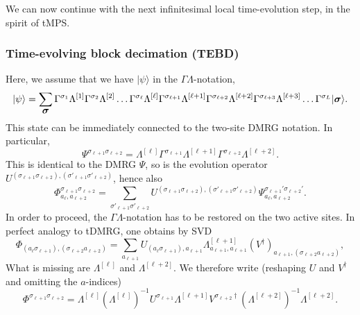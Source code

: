 \documentclass[a4paper,10pt,oneside,onecolumn,1p,times]{elsarticle}
\newcommand{\ket}[1]{\mbox{$| #1  \rangle$}}
\newcommand{\fat}[1]{\mbox{\boldmath$#1$\unboldmath}}	%
\begin{document}
We can now continue with the next infinitesimal local time-evolution step, in the spirit of tMPS.   
\subsubsection{Time-evolving block decimation (TEBD)}
Here, we assume that we have $\ket{\psi}$ in the $\Gamma\Lambda$-notation,
\begin{equation}
\ket{\psi} = \sum_{\fat{\sigma}} 
\Gamma^{\sigma_1} \Lambda^{[1]} \Gamma^{\sigma_2} \Lambda^{[2]} \ldots
\Gamma^{\sigma_{\ell}} \Lambda^{[\ell]}  \Gamma^{\sigma_{\ell+1}} \Lambda^{[\ell+1]}
\Gamma^{\sigma_{\ell+2}} \Lambda^{[\ell+2]}  \Gamma^{\sigma_{\ell+3}} \Lambda^{[\ell+3]} \ldots
\Gamma^{\sigma_L}   
\ket{\fat{\sigma}}.
\label{eq:TEBDstart}
\end{equation}
This state can be immediately connected to the two-site DMRG notation. In particular,
\begin{equation}
\Psi^{\sigma_{\ell+1} \sigma_{\ell+2}} = \Lambda^{[\ell]}  \Gamma^{\sigma_{\ell+1}} \Lambda^{[\ell+1]}
\Gamma^{\sigma_{\ell+2}} \Lambda^{[\ell+2]}  .
\end{equation}
This is identical to the DMRG $\Psi$, so is the evolution operator $U^{(\sigma_{\ell+1} \sigma_{\ell+2}), (\sigma'_{\ell+1} \sigma'_{\ell+2})}$, hence also  
\begin{equation}
\Phi^{\sigma_{\ell+1}\sigma_{\ell+2}}_{a_\ell, a_{\ell+2}} = \sum_{\sigma'_{\ell+1} \sigma'_{\ell+2}}
U^{(\sigma_{\ell+1} \sigma_{\ell+2}), (\sigma'_{\ell+1} \sigma'_{\ell+2})}  \Psi^{\sigma_{\ell+1}'\sigma_{\ell+2}'}_{a_\ell, a_{\ell+2}} . 
\end{equation} 
In order to proceed, the $\Gamma\Lambda$-notation has to be restored on the two active sites. In perfect analogy to tDMRG, one obtains by SVD
\begin{equation}
\Phi_{(a_\ell \sigma_{\ell+1}), (\sigma_{\ell+2} a_{\ell+2})} = \sum_{a_{\ell+1}} U_{(a_\ell \sigma_{\ell+1}),a_{\ell+1}} \Lambda^{[\ell+1]}_{a_{\ell+1},a_{\ell+1}} (V^\dagger)_{a_{\ell+1}, (\sigma_{\ell+2} a_{\ell+2})} ,
\end{equation}
What is missing are $\Lambda^{[\ell]}$ and $\Lambda^{[\ell+2]}$. We therefore write (reshaping $U$ and $V^\dagger$ and omitting the $a$-indices)
\begin{equation}
\Phi^{\sigma_{\ell+1}\sigma_{\ell+2}} = \Lambda^{[\ell]} (\Lambda^{[\ell]})^{-1} U^{\sigma_{\ell+1}} 
 \Lambda^{[\ell+1]} V^{\sigma_{\ell+2}\dagger} ( \Lambda^{[\ell+2]})^{-1}  \Lambda^{[\ell+2]} .
\end{equation}
\end{document}
